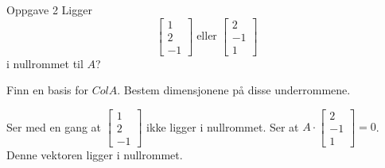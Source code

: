 \documentclass[11pt, a4paper, norsk]{article}
\begin{document}
\begin{Example}{Oppgave 2}{}
                Ligger \[ \begin{bmatrix}
                    1 \\
                    2 \\
                    -1
                \end{bmatrix} \; \text{eller} \; \begin{bmatrix}
                    2 \\
                    -1 \\
                    1
                \end{bmatrix} \] i nullrommet til $A$?

                Finn en basis for $ColA$. Bestem dimensjonene på disse underrommene. 

                Ser med en gang at $\begin{bmatrix}
                    1 \\
                    2 \\
                    -1
                \end{bmatrix}$ ikke ligger i nullrommet. Ser at $A\cdot \begin{bmatrix}
                    2 \\
                    -1 \\
                    1
                \end{bmatrix} = 0$. Denne vektoren ligger i nullrommet. 



\end{Example}
\end{document}
